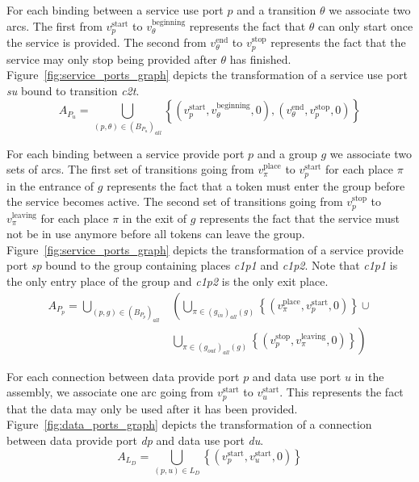 For each binding between a service use port $p$ and a transition $\theta$ we
associate two arcs. The first from $v_p^\text{start}$ to
$v_\theta^\text{beginning}$ represents the fact that $\theta$ can only start
once the service is provided. The second from $v_\theta^\text{end}$ to
$v_p^\text{stop}$ represents the fact that the service may only stop being
provided after $\theta$ has finished.
Figure~\ref{fig:service_ports_graph} depicts the transformation of a
service use port \emph{su} bound to transition \emph{c2t}.
\[
A_{P_{u}}=\bigcup_{\left(p,\theta\right)\in\left(B_{P_{u}}\right)_{all}}\left\{ \left(v_p^\text{start},v_\theta^\text{beginning},0\right),\left(v_\theta^\text{end},v_p^\text{stop},0\right)\right\} 
\]

For each binding between a service provide port $p$ and a group $g$ we
associate two sets of arcs. The first set of transitions going from
$v_\pi^\text{place}$ to $v_p^\text{start}$ for each place $\pi$ in the
entrance of $g$ represents the fact that a token must enter the group
before the service becomes active. The second set of transitions going
from $v_p^\text{stop}$ to $v_\pi^\text{leaving}$ for each place
$\pi$ in the exit of $g$ represents the fact that the service must not
be in use anymore before all tokens can leave the group.
Figure~\ref{fig:service_ports_graph} depicts the transformation of a
service provide port \emph{sp} bound to the group containing places
\emph{c1p1} and \emph{c1p2}. Note that \emph{c1p1} is the only entry
place of the group and \emph{c1p2} is the only exit place.
\begin{align*}
A_{P_{p}}=\bigcup_{\left(p,g\right)\in\left(B_{P_{p}}\right)_{all}} & \left( \bigcup_{\pi\in\left(g_{in}\right)_{all}\left(g\right)}\left\{ \left(v_\pi^\text{place},v_p^\text{start},0\right)\right\} \cup \right. \\
 & \left. \bigcup_{\pi\in\left(g_{out}\right)_{all}\left(g\right)}\left\{ \left(v_p^\text{stop},v_\pi^\text{leaving},0\right)\right\} \right)
\end{align*}

For each connection between data provide port $p$ and data use port $u$
in the assembly, we associate one arc going from $v_p^\text{start}$ to
$v_u^\text{start}$. This represents the fact that the data may only be
used after it has been provided.
Figure~\ref{fig:data_ports_graph} depicts the transformation of a
connection between data provide port \emph{dp} and data use port
\emph{du}.
\[
A_{L_{D}}=\bigcup_{\left(p,u\right)\in L_{D}}\left\{ \left(v_p^\text{start},v_u^\text{start},0\right)\right\} 
\]

